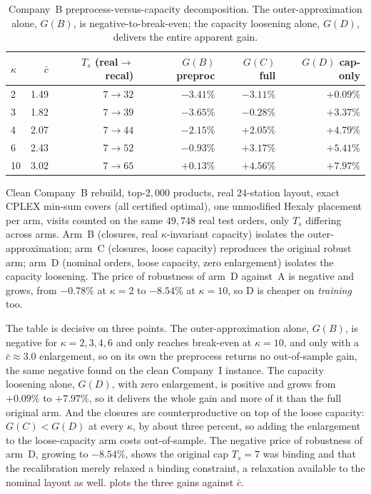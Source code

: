 \documentclass[preprint,review,11pt,authoryear]{elsarticle}
\begin{document}
\begin{table}[t]
  \centering
  \small
  \begin{threeparttable}
  \begin{tabular}{@{}lrrrrr@{}}
    \toprule
    $\kappa$ & $\bar c$ & $T_s$ (real$\to$recal) & $G(B)$ preproc & $G(C)$ full & $G(D)$ cap-only \\
    \midrule
    2  & 1.49 & $7\to32$ & $-3.41\%$ & $-3.11\%$ & $+0.09\%$ \\
    3  & 1.82 & $7\to39$ & $-3.65\%$ & $-0.28\%$ & $+3.37\%$ \\
    4  & 2.07 & $7\to44$ & $-2.15\%$ & $+2.05\%$ & $+4.79\%$ \\
    6  & 2.43 & $7\to52$ & $-0.93\%$ & $+3.17\%$ & $+5.41\%$ \\
    10 & 3.02 & $7\to65$ & $+0.13\%$ & $+4.56\%$ & $+7.97\%$ \\
    \bottomrule
  \end{tabular}
  \begin{tablenotes}\footnotesize
    \item Clean Company~B rebuild, top-$2{,}000$ products, real $24$-station layout, exact CPLEX min-sum covers (all certified optimal), one unmodified Hexaly placement per arm, visits counted on the same $49{,}748$ real test orders, only $T_s$ differing across arms. Arm~B (closures, real $\kappa$-invariant capacity) isolates the outer-approximation; arm~C (closures, loose capacity) reproduces the original robust arm; arm~D (nominal orders, loose capacity, zero enlargement) isolates the capacity loosening. The price of robustness of arm~D against~A is negative and grows, from $-0.78\%$ at $\kappa=2$ to $-8.54\%$ at $\kappa=10$, so D is cheaper on \emph{training} too.
  \end{tablenotes}
  \end{threeparttable}
  \caption{Company~B preprocess-versus-capacity decomposition. The outer-approximation alone, $G(B)$, is negative-to-break-even; the capacity loosening alone, $G(D)$, delivers the entire apparent gain.}
  \label{tab:rc-berner-decomp}
\end{table}

The table is decisive on three points. The outer-approximation alone, $G(B)$, is negative for $\kappa=2,3,4,6$ and only reaches break-even at $\kappa=10$, and only with a $\bar c \approx 3.0$ enlargement, so on its own the preprocess returns no out-of-sample gain, the same negative found on the clean Company~I instance. The capacity loosening alone, $G(D)$, with zero enlargement, is positive and grows from $+0.09\%$ to $+7.97\%$, so it delivers the whole gain and more of it than the full original arm. And the closures are counterproductive on top of the loose capacity: $G(C) < G(D)$ at every $\kappa$, by about three percent, so adding the enlargement to the loose-capacity arm costs out-of-sample. The negative price of robustness of arm~D, growing to $-8.54\%$, shows the original cap $T_s = 7$ was binding and that the recalibration merely relaxed a binding constraint, a relaxation available to the nominal layout as well.  plots the three gains against $\bar c$.
\end{document}
